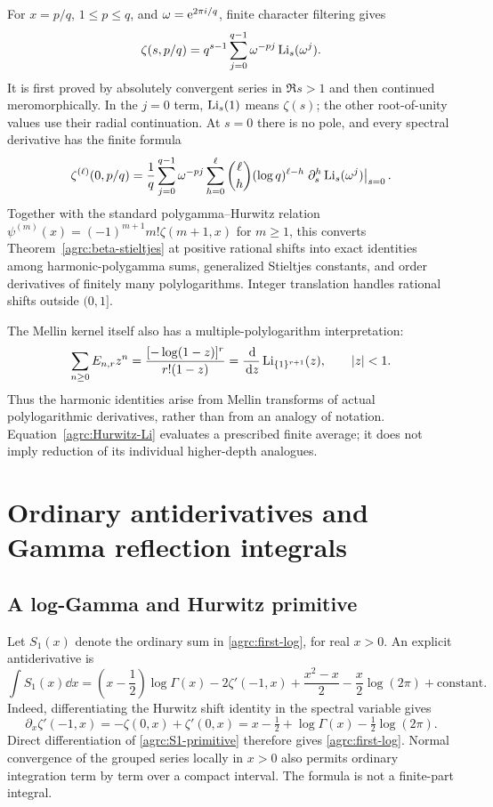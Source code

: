 For $x=p/q$, $1\leq p\leq q$, and $\omega=\mathrm e^{2\pi i/q}$,
finite character filtering gives
\begin{equation}\label{agrc:Hurwitz-Li}
 \zeta(s,p/q)=q^{s-1}\sum_{j=0}^{q-1}\omega^{-pj}\operatorname{Li}_s(\omega^j).
\end{equation}
It is first proved by absolutely convergent series in $\Re s>1$ and
then continued meromorphically. In the $j=0$ term, $\operatorname{Li}_s(1)$ means
$\zeta(s)$; the other root-of-unity values use their radial continuation.
At $s=0$ there is no pole, and every spectral derivative has the finite
formula
\begin{align}
 \zeta^{(\ell)}(0,p/q)
  =\frac1q\sum_{j=0}^{q-1}\omega^{-pj}
       \sum_{h=0}^{\ell}\binom{\ell}{h}(\log q)^{\ell-h}
       \left.\partial_s^h\operatorname{Li}_s(\omega^j)\right|_{s=0}.
 \label{agrc:Li-order-jets}
\end{align}
Together with the standard polygamma--Hurwitz relation
$\psi^{(m)}(x)=(-1)^{m+1}m!\zeta(m+1,x)$ for $m\geq1$,
this converts Theorem~\ref{agrc:beta-stieltjes} at positive rational
shifts into exact identities among harmonic-polygamma sums, generalized
Stieltjes constants, and order derivatives of finitely many polylogarithms.
Integer translation handles rational shifts outside $(0,1]$.

The Mellin kernel itself also has a multiple-polylogarithm interpretation:
\begin{equation}\label{agrc:Li-all-ones}
 \sum_{n\geq0}E_{n,r}z^n
  =\frac{[-\log(1-z)]^r}{r!(1-z)}
  =\frac{\,\mathrm d}{\,\mathrm d z}\operatorname{Li}_{\{1\}^{r+1}}(z),\qquad |z|<1.
\end{equation}
Thus the harmonic identities arise from Mellin transforms of actual
polylogarithmic derivatives, rather than from an analogy of notation.
Equation~\eqref{agrc:Hurwitz-Li} evaluates a prescribed finite average;
it does not imply reduction of its individual higher-depth analogues.

\section{Ordinary antiderivatives and Gamma reflection integrals}
\label{agrc:primitives}

\subsection{A log-Gamma and Hurwitz primitive}

Let $S_1(x)$ denote the ordinary sum in \eqref{agrc:first-log}, for real
$x>0$. An explicit antiderivative is
\begin{equation}\label{agrc:S1-primitive}
 \boxed{\displaystyle
 \int S_1(x)\dd x=
 \left(x-\frac12\right)\log\Gamma(x)-2\zeta'(-1,x)
 +\frac{x^2-x}{2}-\frac{x}{2}\log(2\pi)+\mathrm{constant}.}
\end{equation}
Indeed, differentiating the Hurwitz shift identity in the spectral
variable gives
\[
 \partial_x\zeta'(-1,x)=-\zeta(0,x)+\zeta'(0,x)
 =x-\tfrac12+\log\Gamma(x)-\tfrac12\log(2\pi).
\]
Direct differentiation of \eqref{agrc:S1-primitive} therefore gives
\eqref{agrc:first-log}. Normal convergence of the grouped series locally
in $x>0$ also permits ordinary integration term by term over a compact
interval. The formula is not a finite-part integral.

